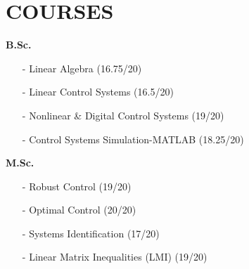 \documentclass[10pt,a4paper,sans]{moderncv} %
\begin{document}
	\section{COURSES}
	\vspace{-1em}
	\begin{multicols}{2}
		 \textbf{B.Sc.}
		\begin{itemize}[nosep, leftmargin=0.9cm]
		    \item[-] Linear Algebra (16.75/20)
		    \item[-] Linear Control Systems (16.5/20)
		    \item[-] Nonlinear \& Digital Control Systems (19/20)
		    \item[-] Control Systems Simulation-MATLAB (18.25/20)
		\end{itemize}
		\columnbreak
		 \textbf{M.Sc.}
        \begin{itemize}[nosep, leftmargin=0.9cm]
	        \item[-] Robust Control (19/20)
		    \item[-] Optimal Control (20/20)
		    \item[-] Systems Identification (17/20)
		    \item[-] Linear Matrix Inequalities (LMI) (19/20)
	    \end{itemize}
	\end{multicols}
	
\end{document}
